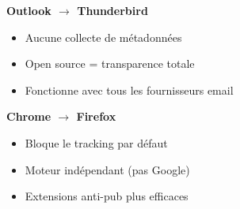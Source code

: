 \documentclass[a0paper,portrait]{baposter}
\begin{document}
\begin{poster}
{  \vspace{0.5em}

  \noindent
  \begin{minipage}[t]{0.28\linewidth}
  \end{minipage}%
  \begin{minipage}[t]{0.7\linewidth}
    \hspace{0.5em}
    \textbf{\color{c4dtblue}Outlook $\rightarrow$ Thunderbird}
    \begin{itemize}
      \item Aucune collecte de métadonnées
      \item Open source = transparence totale
      \item Fonctionne avec tous les fournisseurs email
    \end{itemize}
  \end{minipage}

  \vspace{0.5em}

  \noindent
  \begin{minipage}[t]{0.7\linewidth}
    \textbf{\color{c4dtblue}Chrome $\rightarrow$ Firefox}
    \begin{itemize}
      \item Bloque le tracking par défaut
      \item Moteur indépendant (pas Google)
      \item Extensions anti-pub plus efficaces
    \end{itemize}
  \end{minipage}%
  \begin{minipage}[t]{0.28\linewidth}
    \hspace{0.5em}
  \end{minipage}
}

\end{poster}
\end{document}

